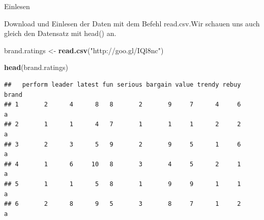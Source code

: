 \documentclass[12pt,ngerman,a4paper,ignorenonframetext,]{beamer}
\newenvironment{Shaded}{\begin{snugshade}}{\end{snugshade}}
\newcommand{\KeywordTok}[1]{\textcolor[rgb]{0.13,0.29,0.53}{\textbf{#1}}}
\newcommand{\NormalTok}[1]{#1}
\newcommand{\StringTok}[1]{\textcolor[rgb]{0.31,0.60,0.02}{#1}}
\begin{document}
\begin{frame}{Einlesen}
\protect\hypertarget{einlesen}{}

Download und Einlesen der Daten mit dem Befehl read.csv.Wir schauen uns
auch gleich den Datensatz mit head() an.

\begin{Shaded}
\begin{Highlighting}[]
\NormalTok{brand.ratings <-}\StringTok{ }\KeywordTok{read.csv}\NormalTok{(}\StringTok{"http://goo.gl/IQl8nc"}\NormalTok{)}

\KeywordTok{head}\NormalTok{(brand.ratings)}
\end{Highlighting}
\end{Shaded}

\begin{verbatim}
##   perform leader latest fun serious bargain value trendy rebuy brand
## 1       2      4      8   8       2       9     7      4     6     a
## 2       1      1      4   7       1       1     1      2     2     a
## 3       2      3      5   9       2       9     5      1     6     a
## 4       1      6     10   8       3       4     5      2     1     a
## 5       1      1      5   8       1       9     9      1     1     a
## 6       2      8      9   5       3       8     7      1     2     a
\end{verbatim}

\end{frame}
\end{document}
